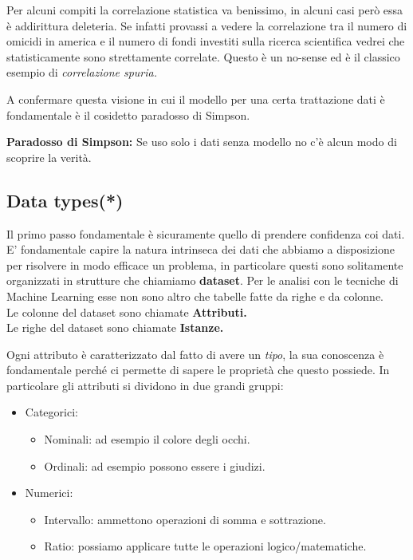 Per alcuni compiti la correlazione statistica va benissimo, in alcuni casi però essa è addirittura deleteria.  Se infatti provassi a vedere la correlazione tra il numero di omicidi in america e il numero di fondi investiti sulla ricerca scientifica vedrei che statisticamente sono strettamente correlate. Questo è un no-sense ed è il classico esempio di \textit{correlazione spuria.}

A confermare questa visione in cui il modello per una certa trattazione dati è fondamentale è il cosidetto paradosso di Simpson.

\textbf{Paradosso di Simpson:} Se uso solo i dati senza modello no c'è alcun modo di scoprire la verità.


\subsection{Data types(*)}

Il primo passo fondamentale è sicuramente quello di prendere confidenza coi dati. E' fondamentale capire la natura intrinseca dei dati che abbiamo a disposizione per risolvere in modo efficace un problema, in particolare questi sono solitamente organizzati in strutture che chiamiamo \textbf{dataset}. Per le analisi con le tecniche di Machine Learning esse non sono altro che tabelle fatte da righe e da colonne.
\\Le colonne del dataset sono chiamate \textbf{Attributi.}
\\Le righe del dataset sono chiamate \textbf{Istanze.}

Ogni attributo è caratterizzato dal fatto di avere un \textit{tipo}, la sua conoscenza è fondamentale perché ci permette di sapere le proprietà che questo possiede.
In particolare gli attributi si dividono in due grandi gruppi:
\begin{itemize}
	\item Categorici:
	\begin{itemize}
		\item Nominali: ad esempio il colore degli occhi.
		\item Ordinali: ad esempio possono essere i giudizi.
	\end{itemize}
	\item Numerici:
	\begin{itemize}
		\item Intervallo: ammettono operazioni di somma e sottrazione. 
		\item Ratio: possiamo applicare tutte le operazioni logico/matematiche.
	\end{itemize}
\end{itemize}


